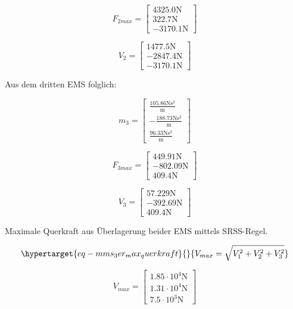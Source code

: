 \documentclass[
  letterpaper,
  DIV=11]{scrreprt}
\begin{document}
\begin{equation}F_{2 max} = \left[\begin{matrix}4325.0 \text{N}\\322.7 \text{N}\\- 3170.1 \text{N}\end{matrix}\right]\end{equation}

\begin{equation}V_{2} = \left[\begin{matrix}1477.5 \text{N}\\- 2847.4 \text{N}\\- 3170.1 \text{N}\end{matrix}\right]\end{equation}

Aus dem dritten EMS folglich:

\begin{equation}m_{3} = \left[\begin{matrix}\frac{105.86 \text{N} \text{s}^{2}}{\text{m}}\\- \frac{188.73 \text{N} \text{s}^{2}}{\text{m}}\\\frac{96.33 \text{N} \text{s}^{2}}{\text{m}}\end{matrix}\right]\end{equation}

\begin{equation}F_{3 max} = \left[\begin{matrix}449.91 \text{N}\\- 802.09 \text{N}\\409.4 \text{N}\end{matrix}\right]\end{equation}

\begin{equation}V_{3} = \left[\begin{matrix}57.229 \text{N}\\- 392.69 \text{N}\\409.4 \text{N}\end{matrix}\right]\end{equation}

Maximale Querkraft aus Überlagerung beider EMS mittels SRSS-Regel.

\begin{equation}\protect\hypertarget{eq-mms_3er_max_querkraft}{}{
V_{max} = \sqrt{V_1^2 + V_2^2 + V_3^2}
}\label{eq-mms_3er_max_querkraft}\end{equation}

\begin{equation}V_{max} = \left[\begin{matrix}1.85 \cdot 10^{4} \text{N}\\1.31 \cdot 10^{4} \text{N}\\7.5 \cdot 10^{3} \text{N}\end{matrix}\right]\end{equation}
\end{document}
